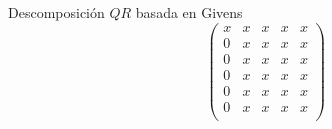 \documentclass{beamer}
\begin{document}
\begin{frame}{Descomposici\'on $QR$ basada en Givens}
{$$\begin{array}{r}
                                               \\
                                               \\
                                              \end{array}\left(\begin{array}{ccccc}
           x & x & x & x & x\\
           0 & x & x & x & x\\
           0 & x & x & x & x\\
           0 & x & x & x & x\\
           0 & x & x & x & x\\
           0 & x & x & x & x\\
          \end{array}\right)
  $$}
  \end{frame}
\end{document}
